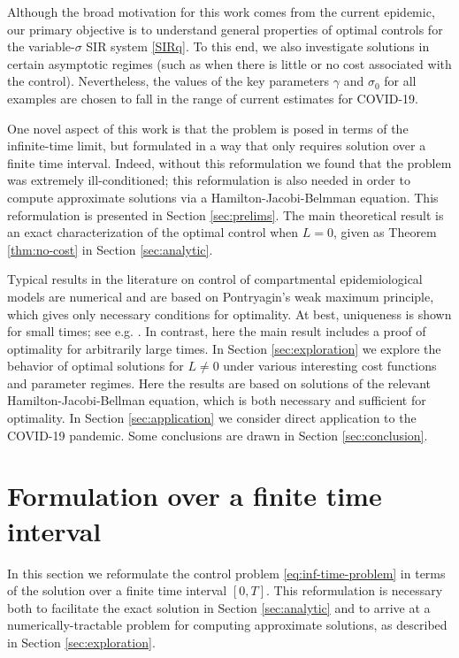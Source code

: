 \documentclass[english,12pt,letter]{article}
\newcommand{\Rnot}{\sigma_0}
\begin{document}
Although the broad motivation for this work comes from the current epidemic,
our primary objective is to understand general properties of optimal controls
for the variable-$\sigma$ SIR system \eqref{SIRq}.  To this end, we also
investigate solutions in certain
asymptotic regimes (such as when there is little or no cost associated
with the control).  Nevertheless, the values of the key parameters $\gamma$
and $\Rnot$ for all examples are chosen to fall in the range of current estimates for
COVID-19.

One novel aspect of this work is that the problem is posed in terms of the
infinite-time limit, but formulated in a way that only requires solution
over a finite time interval.  Indeed, without this reformulation we found
that the problem was extremely ill-conditioned; this reformulation is also
needed in order to compute approximate solutions via a Hamilton-Jacobi-Belmman
equation.
This reformulation is presented in Section \ref{sec:prelims}.  The main theoretical
result is an exact characterization of the optimal control when $L=0$, given
as Theorem \ref{thm:no-cost} in Section \ref{sec:analytic}.  

Typical results in the literature on control of compartmental epidemiological models
are numerical and are based on Pontryagin's weak maximum principle, which gives only
necessary conditions for optimality.  At best, uniqueness is shown for small times; see e.g. 
\cite{kirschner1997optimal,fister1998optimizing,jung2002optimal,yan2008optimal,kar2011stability}.
In contrast, here the main result includes a proof of optimality for arbitrarily large times.
In Section \ref{sec:exploration} we explore
the behavior of optimal solutions for $L\ne 0$ under various interesting
cost functions and parameter regimes.  Here the results are based on
solutions of the relevant Hamilton-Jacobi-Bellman equation, which is
both necessary and sufficient for optimality.
In Section \ref{sec:application} we consider direct application to the COVID-19
pandemic.  Some conclusions are drawn in Section \ref{sec:conclusion}.

\section{Formulation over a finite time interval\label{sec:prelims}}
In this section we reformulate the control problem \eqref{eq:inf-time-problem} in terms of
the solution over a finite time interval $[0,T]$.  This reformulation is
necessary both to facilitate the exact solution in Section \ref{sec:analytic}
and to arrive at a numerically-tractable problem for computing
approximate solutions, as described in Section \ref{sec:exploration}.
\end{document}
